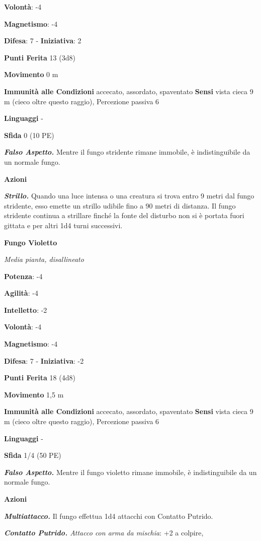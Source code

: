 \begin{multicols}{2}
\textbf{Volontà}: -4

\textbf{Magnetismo}: -4

\textbf{Difesa}: 7 - \textbf{Iniziativa}: 2

\textbf{Punti Ferita} 13 (3d8)

\textbf{Movimento} 0 m

\textbf{Immunità alle Condizioni} accecato, assordato, spaventato
\textbf{Sensi} vista cieca 9 m (cieco oltre questo raggio), Percezione
passiva 6

\textbf{Linguaggi} -

\textbf{Sfida} 0 (10 PE)

\emph{\textbf{Falso Aspetto.}} Mentre il fungo stridente rimane
immobile, è indistinguibile da un normale fungo.

\textbf{Azioni}

\emph{\textbf{Strillo.}} Quando una luce intensa o una creatura si trova
entro 9 metri dal fungo stridente, esso emette un strillo udibile fino a
90 metri di distanza. Il fungo stridente continua a strillare finché la
fonte del disturbo non si è portata fuori gittata e per altri 1d4 turni
successivi.

\textbf{Fungo Violetto}

\emph{Media pianta, disallineato}

\textbf{Potenza}: -4

\textbf{Agilità}: -4

\textbf{Intelletto}: -2

\textbf{Volontà}: -4

\textbf{Magnetismo}: -4

\textbf{Difesa}: 7 - \textbf{Iniziativa}: -2

\textbf{Punti Ferita} 18 (4d8)

\textbf{Movimento} 1,5 m

\textbf{Immunità alle Condizioni} accecato, assordato, spaventato
\textbf{Sensi} vista cieca 9 m (cieco oltre questo raggio), Percezione
passiva 6

\textbf{Linguaggi} -

\textbf{Sfida} 1/4 (50 PE)

\emph{\textbf{Falso Aspetto.}} Mentre il fungo violetto rimane immobile,
è indistinguibile da un normale fungo.

\textbf{Azioni}

\emph{\textbf{Multiattacco.}} Il fungo effettua 1d4 attacchi con
Contatto Putrido.

\emph{\textbf{Contatto Putrido.} Attacco con arma da mischia}: +2 a
colpire,


\end{multicols}
